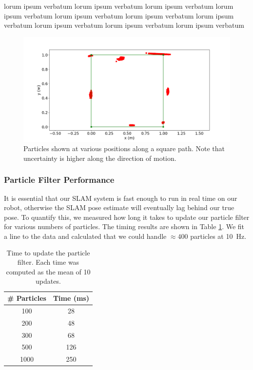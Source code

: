 \documentclass[journal]{IEEEtran}
\begin{document}
            lorum ipsum verbatum lorum ipsum verbatum lorum ipsum verbatum lorum ipsum verbatum lorum ipsum verbatum lorum ipsum verbatum lorum ipsum verbatum lorum ipsum verbatum lorum ipsum verbatum lorum ipsum verbatum 
        
            \begin{figure}[H]
                \centering
                \includegraphics[width=1\linewidth]{drive_square_particles.png}
                \caption{Particles shown at various positions along a square path. Note that uncertainty is higher along the direction of motion.}
                \label{fig:square_particles}
            \end{figure}
    
        \subsubsection{Particle Filter Performance}
        
            It is essential that our SLAM system is fast enough to run in real time on our robot, otherwise the SLAM pose estimate will eventually lag behind our true pose. To quantify this, we measured how long it takes to update our particle filter for various numbers of particles. The timing results are shown in Table \ref{tab:filter_perf}. We fit a line to the data and calculated that we could handle $\approx400$ particles at \SI{10}{\hertz}.
    
            \begin{table}[h]
                \centering
                \begin{tabular}{|c|c|} \hline
                     \# Particles & Time (ms) \\    \hline
                     100 & 28 \\ \hline
                     200 & 48 \\ \hline
                     300 & 68 \\ \hline
                     500 & 126 \\ \hline
                     1000 & 250 \\ \hline
                \end{tabular}
                \caption{Time to update the particle filter. Each time was computed as the mean of 10 updates.}
                \label{tab:filter_perf}
            \end{table}
            
\end{document}
